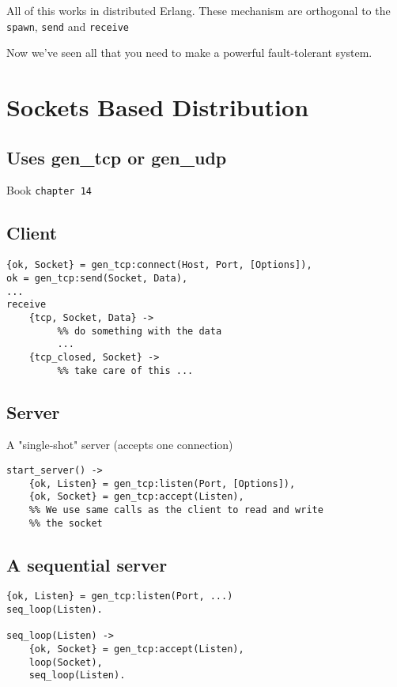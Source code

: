 \documentclass[12pt]{article}
\begin{document}
All of this works in distributed Erlang. These mechanism are orthogonal to
the \verb+spawn+, \verb+send+ and \verb+receive+

Now we've seen all that you need to make a powerful fault-tolerant system.

\section{Sockets Based Distribution}

\subsection{Uses gen\_tcp or gen\_udp}

Book \verb+chapter 14+

\subsection{Client}

\begin{verbatim}
{ok, Socket} = gen_tcp:connect(Host, Port, [Options]),
ok = gen_tcp:send(Socket, Data),
...
receive
    {tcp, Socket, Data} ->
         %% do something with the data
         ...
    {tcp_closed, Socket} ->
         %% take care of this ...    
\end{verbatim}

\subsection{Server}

A "single-shot" server (accepts one connection)

\begin{verbatim}
start_server() ->
    {ok, Listen} = gen_tcp:listen(Port, [Options]),
    {ok, Socket} = gen_tcp:accept(Listen),
    %% We use same calls as the client to read and write
    %% the socket
\end{verbatim}

\subsection{A sequential server}

\begin{verbatim}
{ok, Listen} = gen_tcp:listen(Port, ...)
seq_loop(Listen).

seq_loop(Listen) ->
    {ok, Socket} = gen_tcp:accept(Listen),
    loop(Socket),
    seq_loop(Listen).
\end{verbatim}
\end{document}
